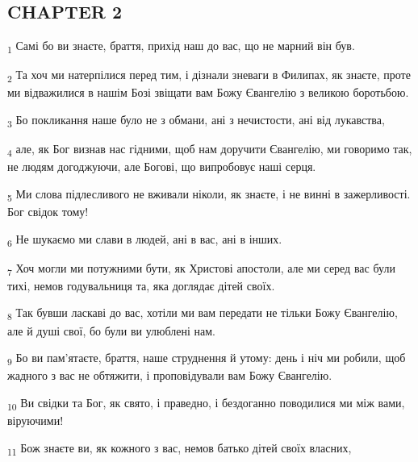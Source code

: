 \subsection{CHAPTER 2}
\begin{tcolorbox}
\textsubscript{1} Самі бо ви знаєте, браття, прихід наш до вас, що не марний він був.
\end{tcolorbox}
\begin{tcolorbox}
\textsubscript{2} Та хоч ми натерпілися перед тим, і дізнали зневаги в Филипах, як знаєте, проте ми відважилися в нашім Бозі звіщати вам Божу Євангелію з великою боротьбою.
\end{tcolorbox}
\begin{tcolorbox}
\textsubscript{3} Бо покликання наше було не з обмани, ані з нечистости, ані від лукавства,
\end{tcolorbox}
\begin{tcolorbox}
\textsubscript{4} але, як Бог визнав нас гідними, щоб нам доручити Євангелію, ми говоримо так, не людям догоджуючи, але Богові, що випробовує наші серця.
\end{tcolorbox}
\begin{tcolorbox}
\textsubscript{5} Ми слова підлесливого не вживали ніколи, як знаєте, і не винні в зажерливості. Бог свідок тому!
\end{tcolorbox}
\begin{tcolorbox}
\textsubscript{6} Не шукаємо ми слави в людей, ані в вас, ані в інших.
\end{tcolorbox}
\begin{tcolorbox}
\textsubscript{7} Хоч могли ми потужними бути, як Христові апостоли, але ми серед вас були тихі, немов годувальниця та, яка доглядає дітей своїх.
\end{tcolorbox}
\begin{tcolorbox}
\textsubscript{8} Так бувши ласкаві до вас, хотіли ми вам передати не тільки Божу Євангелію, але й душі свої, бо були ви улюблені нам.
\end{tcolorbox}
\begin{tcolorbox}
\textsubscript{9} Бо ви пам'ятаєте, браття, наше струднення й утому: день і ніч ми робили, щоб жадного з вас не обтяжити, і проповідували вам Божу Євангелію.
\end{tcolorbox}
\begin{tcolorbox}
\textsubscript{10} Ви свідки та Бог, як свято, і праведно, і бездоганно поводилися ми між вами, віруючими!
\end{tcolorbox}
\begin{tcolorbox}
\textsubscript{11} Бож знаєте ви, як кожного з вас, немов батько дітей своїх власних,
\end{tcolorbox}
